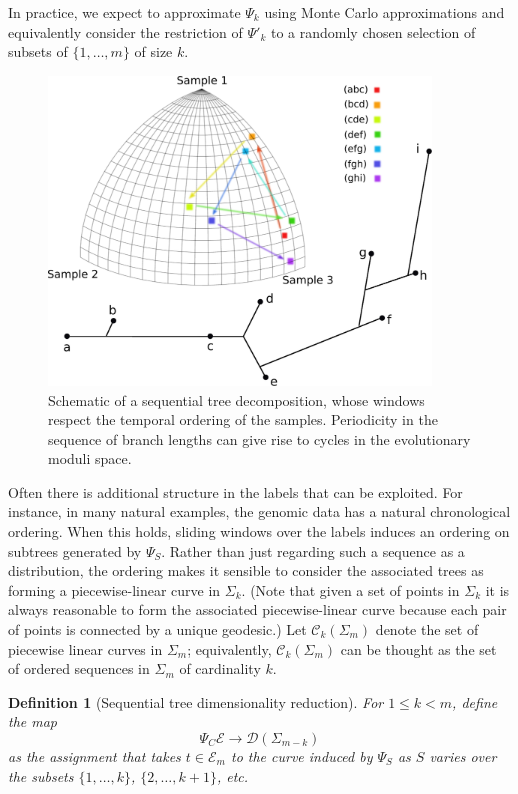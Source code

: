 \documentclass[a4paper,11pt]{article}
\newtheorem{definition}{Definition}
\newcommand{\aC}{\mathcal{C}}
\newcommand{\aD}{\mathcal{D}}
\newcommand{\aE}{\mathcal{E}}
\begin{document}
In practice, we expect to approximate $\Psi_k$ using Monte Carlo approximations and equivalently consider the restriction of $\Psi'_k$ to a randomly chosen selection of subsets of $\{1,\ldots,m\}$ of size $k$.

\begin{figure}
    \centering
    \includegraphics[width=4in]{../figures/dimred_def4.pdf}
    \caption{Schematic of a sequential tree decomposition, whose windows respect the temporal ordering of the samples. Periodicity in the sequence of branch lengths can give rise to cycles in the evolutionary moduli space.}
    \label{fig:definition4}
\end{figure} 

Often there is additional structure in the labels that can be exploited.
For instance, in many natural examples, the genomic data has a natural chronological ordering.
When this holds, sliding windows over the labels induces an ordering on subtrees generated by $\Psi_S$.
Rather than just regarding such a sequence as a distribution, the ordering makes it sensible to consider the associated trees as forming a piecewise-linear curve in $\Sigma_k$.
(Note that given a set of points in $\Sigma_k$ it is always reasonable to form the associated piecewise-linear curve because each pair of points is connected by a unique geodesic.)
Let $\aC_k(\Sigma_m)$ denote the set of piecewise linear curves in $\Sigma_m$; equivalently, $\aC_k(\Sigma_m)$ can be thought as the set of ordered sequences in $\Sigma_m$ of cardinality $k$.

\begin{definition}[Sequential tree dimensionality reduction]
For $1 \leq k < m$, define the map
\[
\Psi_C \aE \to \aD(\Sigma_{m-k})
\]
as the assignment that takes $t \in \aE_m$ to the curve induced by $\Psi_S$ as $S$ varies over the subsets $\{1, \ldots, k\}$, $\{2, \ldots, k+1\}$, etc.
\end{definition}
\end{document}
